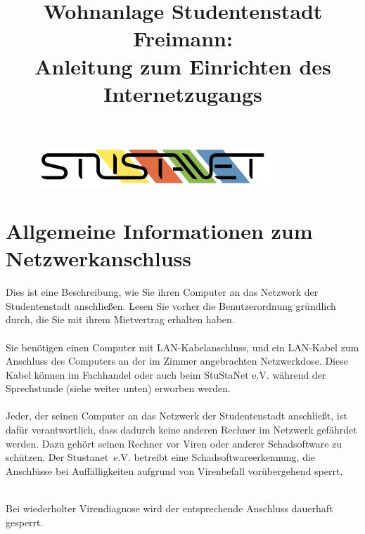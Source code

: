 \documentclass[a4paper,12pt]{scrartcl}
\title{Wohnanlage Studentenstadt Freimann:\\
       Anleitung zum Einrichten des Internetzugangs}
\begin{document}
\maketitle

\begin{figure}[t!]
   \centering
   \vspace{-20pt}
   \includegraphics[width=0.8\textwidth,keepaspectratio]{Bilder/StuStaNet_Logo}
   \vspace{-40pt}
\end{figure}

\section*{Allgemeine Informationen zum Netzwerkanschluss}

Dies ist eine Beschreibung, wie Sie ihren Computer an das Netzwerk der Studentenstadt anschließen. Lesen Sie vorher die Benutzerordnung gründlich durch, die Sie mit ihrem Mietvertrag erhalten haben.
\\
\\
Sie benötigen einen Computer mit LAN-Kabelanschluss, und ein LAN-Kabel zum Anschluss des Computers an der im Zimmer angebrachten Netzwerkdose. Diese Kabel können im Fachhandel oder auch beim StuStaNet e.V. während der Sprechstunde (siehe weiter unten) erworben werden.
\\
\\
Jeder, der seinen Computer an das Netzwerk der Studentenstadt anschließt, ist dafür verantwortlich, dass dadurch keine anderen Rechner im Netzwerk gefährdet werden. Dazu gehört seinen Rechner vor Viren oder anderer Schadsoftware zu schützen.
Der Stustanet~e.V. betreibt eine Schadsoftwareerkennung, die Anschlüsse bei Auffälligkeiten aufgrund von Virenbefall vorübergehend sperrt.
\\
\begin{bfseries}
	\\Bei wiederholter Virendiagnose wird der entsprechende Anschluss dauerhaft gesperrt.
\end{bfseries}




\end{document}
